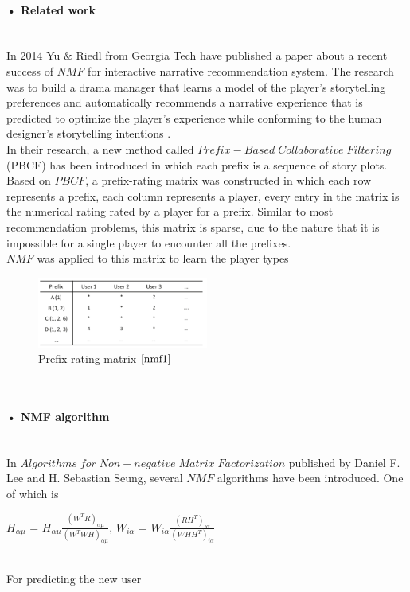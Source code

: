 \documentclass[11pt]{article} %
\begin{document}
\paragraph{• Related work}\mbox{}\\
In 2014 Yu $\&$ Riedl from Georgia Tech have published a paper\cite{nmf1} about a recent success of $NMF$ for interactive narrative recommendation system. The research was to build a drama manager that learns a model of the player’s storytelling preferences and automatically recommends a narrative experience that is predicted to optimize the player’s experience while conforming to the human designer’s storytelling intentions \cite[p.~1]{nmf1}.\\
In their research, a new method called $Prefix-Based\;Collaborative\;Filtering$ (PBCF) \cite[p.~2]{nmf1} has been introduced in which each prefix is a sequence of story plots. Based on $PBCF$, a prefix-rating matrix was constructed in which each row represents a prefix, each column represents a player, every entry in the matrix is the numerical rating rated by a player for a prefix. Similar to most recommendation problems, this matrix is sparse, due to the nature that it is impossible for a single player to encounter all the prefixes.\\
$NMF$ was applied to this matrix to learn the player types
\begin{figure}[!htb]
\caption{Prefix rating matrix $\cite[p.~4]{nmf1}$}
\centering
\includegraphics[width=0.5\textwidth]{prefixrating}
\end{figure}\\

\paragraph{• NMF algorithm}\mbox{}\\
In $Algorithms\;for\;Non-negative\;Matrix\; Factorization$ published by Daniel F. Lee and H. Sebastian Seung, several $NMF$ algorithms have been introduced. One of which is\\
\centerline{$H_{\alpha\mu}$ = $H_{\alpha\mu}\frac{(W^{T}R)_{\alpha\mu}}{(W^{T}WH)_{\alpha\mu}}$, $W_{i\alpha}$ = $W_{i\alpha}\frac{(RH^{T})_{i\alpha}}{(WHH^{T})_{i\alpha}}$ \cite[p.~3]{nmfalg}}\\
For predicting the new user 
\end{document}
